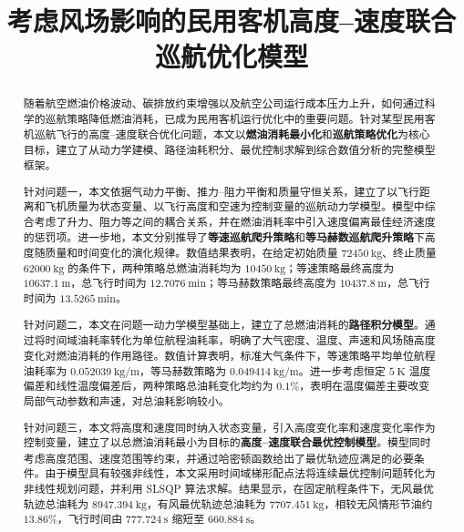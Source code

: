 \documentclass[UTF8]{ctexart}
\title{\textbf{考虑风场影响的民用客机高度--速度联合巡航优化模型}}%
\date{}%
\author{}%
\providecommand{\sihao}{}
\begin{document}
\setcounter{page}{1}%
\maketitle
\vspace{-0.95cm}
\thispagestyle{fancy}   
\fancyhf{} %
\renewcommand{\headrulewidth}{0pt} %
\renewcommand{\abstractname}{\sihao 摘\quad 要} %
\begin{abstract}
随着航空燃油价格波动、碳排放约束增强以及航空公司运行成本压力上升，如何通过科学的巡航策略降低燃油消耗，已成为民用客机运行优化中的重要问题。针对某型民用客机巡航飞行的高度--速度联合优化问题，本文以\textbf{燃油消耗最小化}和\textbf{巡航策略优化}为核心目标，建立了从动力学建模、路径油耗积分、最优控制求解到综合数值分析的完整模型框架。

针对问题一，本文依据气动力平衡、推力--阻力平衡和质量守恒关系，建立了以飞行距离和飞机质量为状态变量、以飞行高度和空速为控制变量的巡航动力学模型。模型中综合考虑了升力、阻力等之间的耦合关系，并在燃油消耗率中引入速度偏离最佳经济速度的惩罚项。进一步地，本文分别推导了\textbf{等速巡航爬升策略}和\textbf{等马赫数巡航爬升策略}下高度随质量和时间变化的演化规律。数值结果表明，在给定初始质量 $72450\ \mathrm{kg}$、终止质量 $62000\ \mathrm{kg}$ 的条件下，两种策略总燃油消耗均为 $10450\ \mathrm{kg}$；等速策略最终高度为 $10637.1\ \mathrm{m}$，总飞行时间为 $12.7076\ \mathrm{min}$；等马赫数策略最终高度为 $10437.8\ \mathrm{m}$，总飞行时间为 $13.5265\ \mathrm{min}$。

针对问题二，本文在问题一动力学模型基础上，建立了总燃油消耗的\textbf{路径积分模型}。通过将时间域油耗率转化为单位航程油耗率，明确了大气密度、温度、声速和风场随高度变化对燃油消耗的作用路径。数值计算表明，标准大气条件下，等速策略平均单位航程油耗率为 $0.052039\ \mathrm{kg/m}$，等马赫数策略为 $0.049414\ \mathrm{kg/m}$。进一步考虑恒定 $5\ \mathrm{K}$ 温度偏差和线性温度偏差后，两种策略总油耗变化均约为 $0.1\%$，表明在温度偏差主要改变局部气动参数和声速，对总油耗影响较小。

针对问题三，本文将高度和速度同时纳入状态变量，引入高度变化率和速度变化率作为控制变量，建立了以总燃油消耗最小为目标的\textbf{高度--速度联合最优控制模型}。模型同时考虑高度范围、速度范围等约束，并通过哈密顿函数给出了最优轨迹应满足的必要条件。由于模型具有较强非线性，本文采用时间域梯形配点法将连续最优控制问题转化为非线性规划问题，并利用 SLSQP 算法求解。结果显示，在固定航程条件下，无风最优轨迹总油耗为 $8947.394\ \mathrm{kg}$，有风最优轨迹总油耗为 $7707.451\ \mathrm{kg}$，相较无风情形节油约 $13.86\%$，飞行时间由 $777.724\ \mathrm{s}$ 缩短至 $660.884\ \mathrm{s}$。


\end{abstract}
\end{document}
